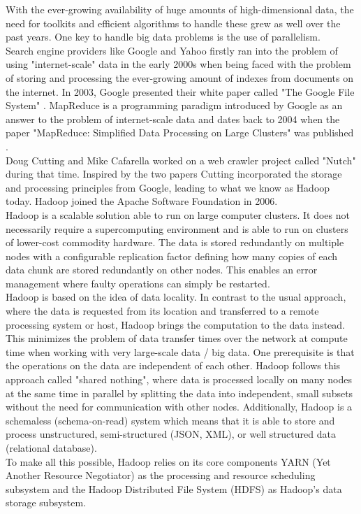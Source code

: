 With the ever-growing availability of huge amounts of high-dimensional data, the need for toolkits and efficient algorithms to handle these grew as well over the past years. One key to handle big data problems is the use of parallelism.\\
Search engine providers like Google and Yahoo firstly ran into the problem of using "internet-scale" data in the early 2000s when being faced with the problem of storing and processing the ever-growing amount of indexes from documents on the internet. In 2003, Google presented their white paper called "The Google File System" \cite{gfs}. MapReduce is a programming paradigm introduced by Google as an answer to the problem of internet-scale data and dates back to 2004 when the paper "MapReduce: Simplified Data Processing on Large Clusters" was published \cite{mapreduce1}.\\ 
Doug Cutting and Mike Cafarella worked on a web crawler project called "Nutch" during that time. Inspired by the two papers Cutting incorporated the storage and processing principles from Google, leading to what we know as Hadoop today. Hadoop joined the Apache Software Foundation in 2006. \cite[p. 6]{sparkbook1}\\ 
Hadoop is a scalable solution able to run on large computer clusters. It does not necessarily require a supercomputing environment and is able to run on clusters of lower-cost commodity hardware. The data is stored redundantly on multiple nodes with a configurable replication factor defining how many copies of each data chunk are stored redundantly on other nodes. This enables an error management where faulty operations can simply be restarted.\\
Hadoop is based on the idea of data locality. In contrast to the usual approach, where the data is requested from its location and transferred to a remote processing system or host, Hadoop brings the computation to the data instead. This minimizes the problem of data transfer times over the network at compute time when working with very large-scale data / big data. One prerequisite is that the operations on the data are independent of each other. Hadoop follows this approach called "shared nothing", where data is processed locally on many nodes at the same time in parallel by splitting the data into independent, small subsets without the need for communication with other nodes. Additionally, Hadoop is a schemaless (schema-on-read) system which means that it is able to store and process unstructured, semi-structured (JSON, XML), or well structured data (relational database). \cite[p. 7]{sparkbook1}\\
To make all this possible, Hadoop relies on its core components YARN (Yet Another Resource Negotiator) as the processing and resource scheduling subsystem and the Hadoop Distributed File System (HDFS) as Hadoop's data storage subsystem.\\


